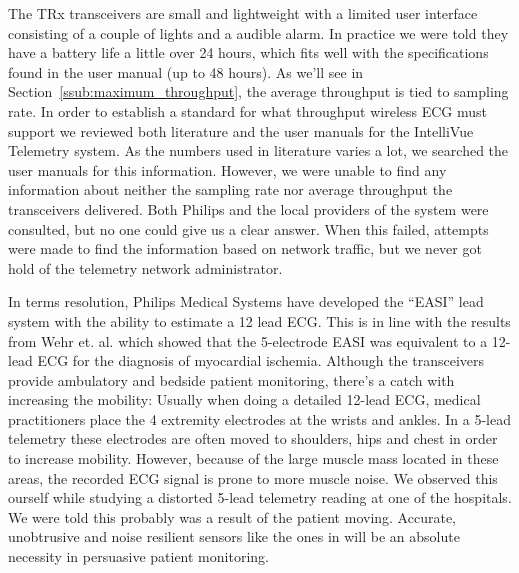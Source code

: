 The TRx transceivers are small and lightweight with a limited user interface consisting of a couple of lights and a audible alarm. In practice we were told they have a battery life a little over 24 hours, which fits well with the specifications found in the user manual (up to 48 hours). As we'll see in Section~\ref{ssub:maximum_throughput}, the average throughput is tied to sampling rate. In order to establish a standard for what throughput wireless ECG must support we reviewed both literature and the user manuals for the IntelliVue Telemetry system. As the numbers used in literature varies a lot, we searched the user manuals for this information. However, we were unable to find any information about neither the sampling rate nor average throughput the transceivers delivered. Both Philips and the local providers of the system were consulted, but no one could give us a clear answer. When this failed, attempts were made to find the information based on network traffic, but we never got hold of the telemetry network administrator.

In terms resolution, Philips Medical Systems have developed the ``EASI'' lead system with the ability to estimate a 12 lead ECG. This is in line with the results from \cite{Wehr:2006ht} Wehr et. al. which showed that the 5-electrode EASI was equivalent to a 12-lead ECG for the diagnosis of myocardial ischemia. Although the transceivers provide ambulatory and bedside patient monitoring, there's a catch with increasing the mobility: Usually when doing a detailed 12-lead ECG, medical practitioners place the 4 extremity electrodes at the wrists and ankles. In a 5-lead telemetry these electrodes are often moved to shoulders, hips and chest in order to increase mobility. However, because of the large muscle mass located in these areas, the recorded ECG signal is prone to more muscle noise. We observed this ourself while studying a distorted 5-lead telemetry reading at one of the hospitals. We were told this probably was a result of the patient moving. Accurate, unobtrusive and noise resilient sensors like the ones in \cite{ChulsungPark:2006tf, Anonymous:FtVb5yQr} will be an absolute necessity in persuasive patient monitoring. 

